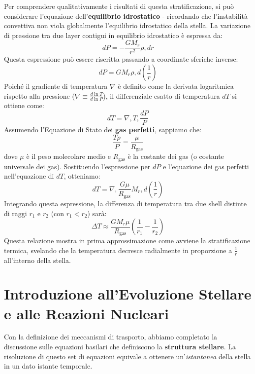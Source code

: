 Per comprendere qualitativamente i risultati di questa stratificazione, si può considerare l'equazione dell'\textbf{equilibrio idrostatico} - ricordando che l'instabilità convettiva non viola globalmente l'equilibrio idrostatico della stella.
La variazione di pressione tra due layer contigui in equilibrio idrostatico è espressa da:
\begin{equation}
dP = - \frac{G M_r}{r^2} \rho , dr
\end{equation}
Questa espressione può essere riscritta passando a coordinate sferiche inverse:
\begin{equation}
dP = G M_r \rho , d\left(\frac{1}{r}\right)
\end{equation}
Poiché il gradiente di temperatura $\nabla$ è definito come la derivata logaritmica rispetto alla pressione ($\nabla \equiv \frac{d \ln T}{d \ln P}$), il differenziale esatto di temperatura $dT$ si ottiene come:
\begin{equation}
dT = \nabla , T , \frac{dP}{P}
\end{equation}
Assumendo l'Equazione di Stato dei \textbf{gas perfetti}, sappiamo che:
\begin{equation}
\frac{T \rho}{P} = \frac{\mu}{R_{\text{gas}}}
\end{equation}
dove $\mu$ è il peso molecolare medio e $R_{\text{gas}}$ è la costante dei gas (o costante universale dei gas). Sostituendo l'espressione per $dP$ e l'equazione dei gas perfetti nell'equazione di $dT$, otteniamo:
\begin{equation}
dT = \nabla , \frac{G \mu}{R_{\text{gas}}} M_r , d\left(\frac{1}{r}\right)
\end{equation}
Integrando questa espressione, la differenza di temperatura tra due shell distinte di raggi $r_1$ e $r_2$ (con $r_1 < r_2$) sarà:
\begin{equation}
\Delta T \approx \frac{G M_r \mu}{R_{\text{gas}}} \left( \frac{1}{r_1} - \frac{1}{r_2} \right)
\end{equation}
Questa relazione mostra in prima approssimazione come avviene la stratificazione termica, svelando che la temperatura decresce radialmente in proporzione a $\frac{1}{r}$ all'interno della stella.

\section{Introduzione all'Evoluzione Stellare e alle Reazioni Nucleari}

Con la definizione dei meccanismi di trasporto, abbiamo completato la discussione sulle equazioni basilari che definiscono la \textbf{struttura stellare}. La risoluzione di questo set di equazioni equivale a ottenere un'\textit{istantanea} della stella in un dato istante temporale.

